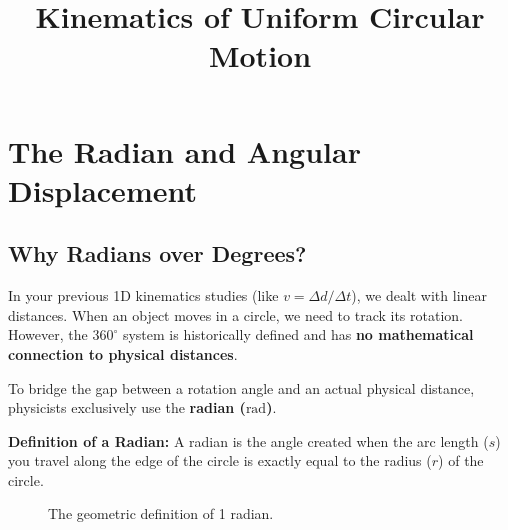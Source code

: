 \documentclass{article}
\begin{document}
\title{Kinematics of Uniform Circular Motion}
\author{}
\date{}
\maketitle


\section{The Radian and Angular Displacement}

\subsection{Why Radians over Degrees?}
In your previous 1D kinematics studies (like $v = \Delta d / \Delta t$), we dealt with linear distances. When an object moves in a circle, we need to track its rotation. However, the $360^\circ$ system is historically defined and has \textbf{no mathematical connection to physical distances}. 

To bridge the gap between a rotation angle and an actual physical distance, physicists exclusively use the \textbf{radian ($\text{rad}$)}. 

\textbf{Definition of a Radian:} A radian is the angle created when the arc length ($s$) you travel along the edge of the circle is exactly equal to the radius ($r$) of the circle.

\begin{figure}[h]
    \centering
    \caption{The geometric definition of 1 radian.}
\end{figure}
\end{document}
